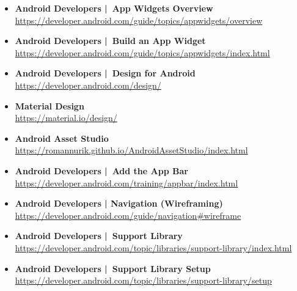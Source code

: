 \documentclass[a4paper]{article}
\begin{document}
{\begin{itemize}
		\item \textbf{Android Developers | App Widgets Overview}\\
		\href{https://developer.android.com/guide/topics/appwidgets/overview}
		{https://developer.android.com/guide/topics/appwidgets/overview}
		
		\item \textbf{Android Developers | Build an App Widget}\\
		\href{https://developer.android.com/guide/topics/appwidgets/index.html}
		{https://developer.android.com/guide/topics/appwidgets/index.html}
		
		\item \textbf{Android Developers | Design for Android}\\
		\href{https://developer.android.com/design/}
		{https://developer.android.com/design/}
		
		\item \textbf{Material Design}\\
		\href{https://material.io/design/}
		{https://material.io/design/}
		
		\item \textbf{Android Asset Studio}\\
		\href{https://romannurik.github.io/AndroidAssetStudio/index.html}
		{https://romannurik.github.io/AndroidAssetStudio/index.html}
		
		\item \textbf{Android Developers | Add the App Bar}\\
		\href{https://developer.android.com/training/appbar/index.html}
		{https://developer.android.com/training/appbar/index.html}
		
		\item \textbf{Android Developers | Navigation (Wireframing)}\\
		\href{https://developer.android.com/guide/navigation#wireframe}
		{https://developer.android.com/guide/navigation\#wireframe}
		
		\item \textbf{Android Developers | Support Library}\\
		\href{https://developer.android.com/topic/libraries/support-library/index.html}
		{https://developer.android.com/topic/libraries/support-library/index.html}
		
		\item \textbf{Android Developers | Support Library Setup}\\
		\href{https://developer.android.com/topic/libraries/support-library/setup}
		{https://developer.android.com/topic/libraries/support-library/setup}
		

\end{itemize}}
\end{document}

